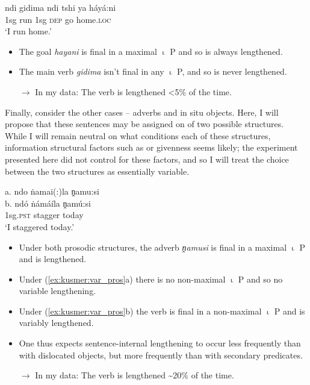 \documentclass[output=paper,modfonts,nonflat,draftmode]{langsci/langscibook}
\begin{document}
\ea \label{ex:kusmer:sec_pros}
\gll {\lipm} ndi gidima {\lipn} ndi tshi ya háyá:ni {\ripn} {\ripm}\\
{} 1sg run {} 1sg \textsc{dep} go home.\textsc{loc} {} {}\\
	\glt `I run home.'
	\z

\begin{itemize}

	\item The goal \textit{hayani} is final in a maximal  $\upiota$ P and so is always
		lengthened.

	\item The main verb \textit{gidima} isn't final in any $\upiota$ P, and so is never lengthened.
	\item[$\rightarrow$] In my data: The verb is lengthened <5\% of the time.
\end{itemize}

Finally, consider the other cases -- adverbs and  {in situ} objects.
Here, I will propose that these sentences may be assigned on of two possible
structures. While I will remain neutral on what conditions each of these
structures, information structural factors such as  or givenness seems
likely; the experiment presented here did not control for these factors, and so
I will treat the choice between the two structures as essentially variable.



\ea \label{ex:kusmer:var_pros} 
\glll a. {\hspace{1em}} {\lipm} {\lipn} ndo ṅamai(:)la {\ripn} ṋamu:si {\ripm}\\
b. {} {\lipm} {} ndó ṅámáíla {} ṋamú:si {\ripm}\\
{} {} {} {} 1sg.\textsc{pst} stagger {} today {}\\
		\glt  `I staggered today.'
\z

		  \begin{itemize}
	\item Under both prosodic structures, the adverb \textit{ṋamusi} is final in a
		maximal $\upiota$ P and is lengthened.
	\item Under (\ref{ex:kusmer:var_pros}a) there is no non-maximal $\upiota$ P and so no variable
		lengthening.
	\item Under (\ref{ex:kusmer:var_pros}b) the verb is final in a non-maximal $\upiota$ P and is
		variably lengthened.
	\item One thus expects sentence-internal lengthening to occur less frequently
		than with dislocated objects, but more frequently than with secondary
		predicates.
	\item[$\rightarrow$] In my data: The verb is lengthened \textasciitilde 20\%
		of the time.

\end{itemize}
\end{document}
